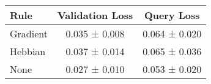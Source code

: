 \begin{tabular}{lcc}
\toprule
Rule & Validation Loss & Query Loss \\
\midrule
Gradient & 0.035 ± 0.008 & 0.064 ± 0.020 \\
Hebbian & 0.037 ± 0.014 & 0.065 ± 0.036 \\
None & 0.027 ± 0.010 & 0.053 ± 0.020 \\
\bottomrule
\end{tabular}
